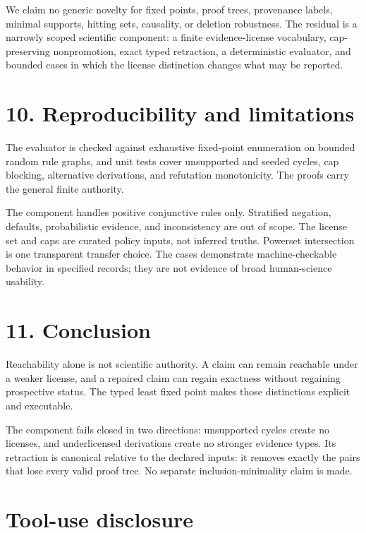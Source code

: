 \documentclass[
  11pt,
]{article}
\begin{document}
We claim no generic novelty for fixed points, proof trees, provenance
labels, minimal supports, hitting sets, causality, or deletion
robustness. The residual is a narrowly scoped scientific component: a
finite evidence-license vocabulary, cap-preserving nonpromotion, exact
typed retraction, a deterministic evaluator, and bounded cases in which
the license distinction changes what may be reported.

\hypertarget{reproducibility-and-limitations}{%
\section{10. Reproducibility and
limitations}\label{reproducibility-and-limitations}}

The evaluator is checked against exhaustive fixed-point enumeration on
bounded random rule graphs, and unit tests cover unsupported and seeded
cycles, cap blocking, alternative derivations, and refutation
monotonicity. The proofs carry the general finite authority.

The component handles positive conjunctive rules only. Stratified
negation, defaults, probabilistic evidence, and inconsistency are out of
scope. The license set and caps are curated policy inputs, not inferred
truths. Powerset intersection is one transparent transfer choice. The
cases demonstrate machine-checkable behavior in specified records; they
are not evidence of broad human-science usability.

\hypertarget{conclusion}{%
\section{11. Conclusion}\label{conclusion}}

Reachability alone is not scientific authority. A claim can remain
reachable under a weaker license, and a repaired claim can regain
exactness without regaining prospective status. The typed least fixed
point makes those distinctions explicit and executable.

The component fails closed in two directions: unsupported cycles create
no licenses, and underlicensed derivations create no stronger evidence
types. Its retraction is canonical relative to the declared inputs: it
removes exactly the pairs that lose every valid proof tree. No separate
inclusion-minimality claim is made.

\hypertarget{tool-use-disclosure}{%
\section{Tool-use disclosure}\label{tool-use-disclosure}}
\end{document}
